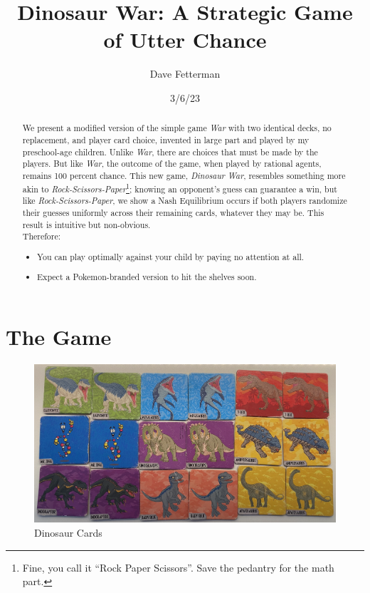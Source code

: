 \documentclass[11pt, oneside]{article} 	%
\title{Dinosaur War: A Strategic Game of Utter Chance}
\author{Dave Fetterman}
\affil{Obviously Unemployed}
\date{3/6/23}
\begin{document}
\maketitle

\begin{abstract}

We present a modified version of the simple game \emph{War} with two identical decks, no replacement, and player card choice, invented in large part and played by my preschool-age children. Unlike \emph{War}, there are choices that must be made by the players. But like \emph{War}, the outcome of the game, when played by rational agents, remains 100 percent chance. This new game, \emph{Dinosaur War}, resembles something more akin to \emph{Rock-Scissors-Paper}\footnote{Fine, you call it ``Rock Paper Scissors''. Save the pedantry for the math part.}; knowing an opponent's guess can guarantee a win, but like \emph{Rock-Scissors-Paper}, we show a Nash Equilibrium occurs if both players randomize their guesses uniformly across their remaining cards, whatever they may be. This result is intuitive but non-obvious.
\\

Therefore:
\begin{itemize}
\item You can play optimally against your child by paying no attention at all.
\item Expect a Pokemon-branded version to hit the shelves soon.
\end{itemize}

\end{abstract}

\section{The Game}


\begin{figure}
\centering
\includegraphics[scale=.3]{cards}
\caption{Dinosaur Cards}
\end{figure}
\end{document}
